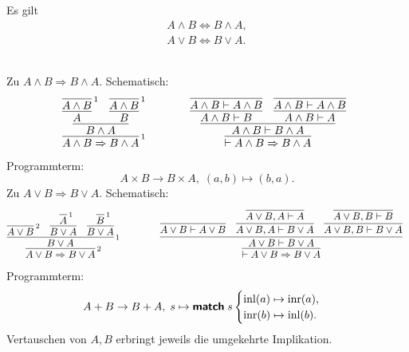 \begin{Satz}%
\label{bool-cl}
Es gilt
\begin{gather}
A\land B \iff B\land A,\\
A\lor B \iff B\lor A.
\end{gather}
\end{Satz}
\begin{Beweis}\\
Zu $A\land B\Rightarrow B\land A$. Schematisch:
\[
\begin{array}{@{}l@{\qquad\qquad}l}
\infer[\infernote{1}]{A\land B\Rightarrow B\land A}{
  \infer{B\land A}{
     \infer{A}{\infer[\infernote{1}]{A\land B}{}}
     & \infer{B}{\infer[\infernote{1}]{A\land B}{}}
  }
}
&
\infer{\vdash A\land B\Rightarrow B\land A}{
  \infer{A\land B\vdash B\land A}{
    \infer{A\land B\vdash B}{
      \infer{A\land B\vdash A\land B}{}}
    & \infer{A\land B\vdash A}{
      \infer{A\land B\vdash A\land B}{}}
  }
}
\end{array}
\]
Programmterm:
\[A\times B\to B\times A,\; (a,b)\mapsto (b,a).\]
Zu $A\lor B\Rightarrow B\lor A$. Schematisch:
\[
\begin{array}{@{}l@{\qquad\qquad}l}
\infer[\infernote{2}]{A\lor B\Rightarrow B\lor A}{
  \infer[\infernote{1}]{B\lor A}{
    \infer[\infernote{2}]{A\lor B}{}
    & \infer{B\lor A}{\infer[\infernote{1}]{A}{}}
    & \infer{B\lor A}{\infer[\infernote{1}]{B}{}}}}
&
\infer{\vdash A\lor B\Rightarrow B\lor A}{
  \infer{A\lor B\vdash B\lor A}{
    \infer{A\lor B\vdash A\lor B}{}
    & \infer{A\lor B, A\vdash B\lor A}{
        \infer{A\lor B, A\vdash A}{}}
    & \infer{A\lor B, B\vdash B\lor A}{
        \infer{A\lor B, B\vdash B}{}}}}
\end{array}
\]
Programmterm:
\[A+B\to B+A,\; s\mapsto\text{{\normalfont\sffamily\bfseries match}}\; s\begin{cases}
\operatorname{inl}(a)\mapsto \operatorname{inr}(a),\\
\operatorname{inr}(b)\mapsto \operatorname{inl}(b).
\end{cases}\]
Vertauschen von $A,B$ erbringt jeweils die umgekehrte Implikation.\;\qedsymbol
\end{Beweis}

